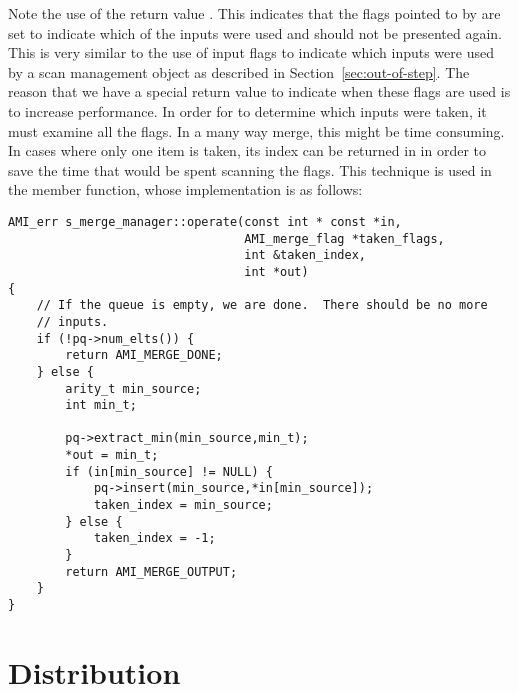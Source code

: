 Note the use of the return value .  This
indicates that the flags pointed to by  are set to
indicate which of the inputs were used and should not be presented
again.  This is very similar to the use of input flags to indicate
which inputs were used by a scan management object as described in
Section~\ref{sec:out-of-step}.  The reason that we have a special
return value to indicate when these flags are used is to increase
performance.  In order for  to determine which inputs
were taken, it must examine all the flags.  In a many way merge, this
might be time consuming.  In cases where only one item is taken, its
index can be returned in  in order to save the time
that would be spent scanning the flags.  This technique is used in the
 member function, whose implementation is as follows:

\begin{verbatim}
AMI_err s_merge_manager::operate(const int * const *in,
                                 AMI_merge_flag *taken_flags,
                                 int &taken_index,
                                 int *out)
{
    // If the queue is empty, we are done.  There should be no more
    // inputs.
    if (!pq->num_elts()) {
        return AMI_MERGE_DONE;
    } else {
        arity_t min_source;
        int min_t;

        pq->extract_min(min_source,min_t);
        *out = min_t;
        if (in[min_source] != NULL) {
            pq->insert(min_source,*in[min_source]);
            taken_index = min_source;
        } else {
            taken_index = -1;
        }
        return AMI_MERGE_OUTPUT;
    }
}
\end{verbatim}


\section{Distribution} \label{sec:distribution}

\tobewritten


%


